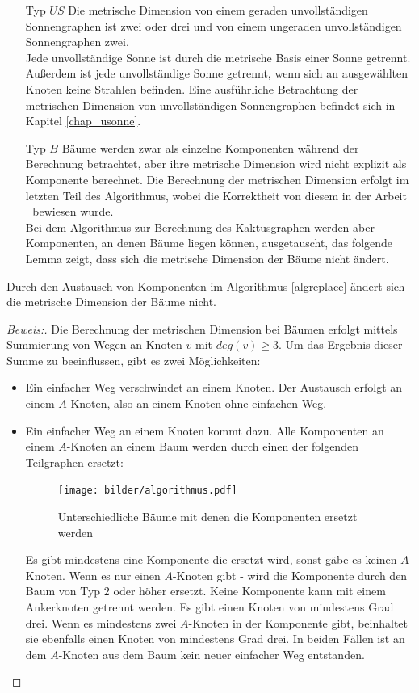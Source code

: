 \begin{itemize}
\item[Typ $US$]
Die metrische Dimension von einem geraden unvollständigen Sonnengraphen ist zwei oder drei und von einem ungeraden unvollständigen Sonnengraphen zwei.\\
Jede unvollständige Sonne ist durch die metrische Basis einer Sonne getrennt. Außerdem ist jede unvollständige Sonne getrennt, wenn sich an ausgewählten Knoten keine Strahlen befinden. Eine ausführliche Betrachtung der metrischen Dimension von unvollständigen Sonnengraphen befindet sich in Kapitel \ref{chap_usonne}.
\item[Typ $B$]
Bäume werden zwar als einzelne Komponenten während der Berechnung betrachtet, aber ihre metrische Dimension wird nicht explizit als Komponente berechnet. Die Berechnung der metrischen Dimension erfolgt im letzten Teil des Algorithmus, wobei die Korrektheit von diesem in der Arbeit \grqq$\;$\cite{landmarks} bewiesen wurde.\\
Bei dem Algorithmus zur Berechnung des Kaktusgraphen werden aber Komponenten, an denen Bäume liegen können, ausgetauscht, das folgende Lemma zeigt, dass sich die metrische Dimension der Bäume nicht ändert.
\end{itemize}
\begin{lem}
Durch den Austausch von Komponenten im Algorithmus \ref{algreplace} ändert sich die metrische Dimension der Bäume nicht.
\end{lem}\vspace{-6mm}
\begin{proof}[Beweis:]
Die Berechnung der metrischen Dimension bei Bäumen erfolgt mittels Summierung von Wegen an Knoten $v$ mit $deg(v)\geq 3$. Um das Ergebnis dieser Summe zu beeinflussen, gibt es zwei Möglichkeiten:
\begin{itemize}
\item Ein einfacher Weg verschwindet an einem Knoten. Der Austausch erfolgt an einem $A$-Knoten, also an einem Knoten ohne einfachen Weg. 
\item Ein einfacher Weg an einem Knoten kommt dazu. Alle Komponenten an einem $A$-Knoten an einem Baum werden durch einen der folgenden Teilgraphen ersetzt:
\vspace{-4mm}
\begin{figure}[h!]
		\centering 		 
   \texttt{[image: bilder/algorithmus.pdf]}
	\caption{Unterschiedliche Bäume mit denen die Komponenten ersetzt werden}
  	 \end{figure}
  	 \vspace{-3mm}
Es gibt mindestens eine Komponente die ersetzt wird, sonst gäbe es keinen $A$-Knoten. Wenn es nur einen $A$-Knoten gibt - wird die Komponente durch den Baum von Typ $2$ oder höher ersetzt. Keine Komponente kann mit einem Ankerknoten getrennt werden. Es gibt einen Knoten von mindestens Grad drei. Wenn es mindestens zwei $A$-Knoten in der Komponente gibt, beinhaltet sie ebenfalls einen Knoten von mindestens Grad drei. In beiden Fällen ist an dem $A$-Knoten aus dem Baum kein neuer einfacher Weg entstanden.
\end{itemize}
\vspace{-1mm}
\end{proof}
\vspace{-12mm}
